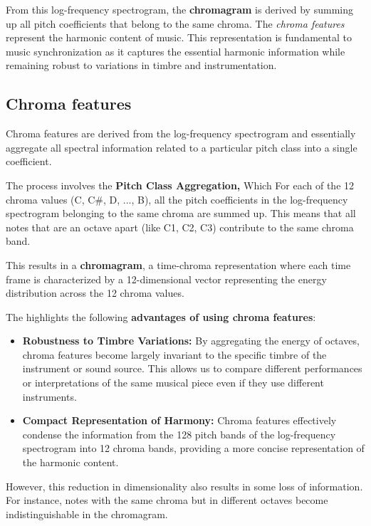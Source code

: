 \documentclass[a4paper, 9pt, twocolumn]{extarticle}
\begin{document}
    From this log-frequency spectrogram, the \textbf{chromagram} is derived
    by summing up all pitch coefficients that belong to the same chroma. The
    \emph{chroma features} represent the harmonic content of music. This
    representation is fundamental to music synchronization as it captures
    the essential harmonic information while remaining robust to variations
    in timbre and instrumentation.
    \subsection{Chroma features}
    Chroma features are derived from the log-frequency spectrogram
    and essentially aggregate all spectral information related to a
    particular pitch class into a single coefficient.
    
    The process involves the \textbf{Pitch Class Aggregation,} Which For
    each of the 12 chroma values (C, C\#, D, ..., B), all the pitch
    coefficients in the log-frequency spectrogram belonging to the same
    chroma are summed up. This means that all notes that are an octave apart
    (like C1, C2, C3) contribute to the same chroma band.
    
    This results in a \textbf{chromagram}, a time-chroma representation
    where each time frame is characterized by a 12-dimensional vector
    representing the energy distribution across the 12 chroma values.
    
    The highlights the following \textbf{advantages of using chroma
    features}:
    
    \begin{itemize}
    \item
      \textbf{Robustness to Timbre Variations:} By aggregating the energy of
      octaves, chroma features become largely invariant to the specific
      timbre of the instrument or sound source. This allows us to compare
      different performances or interpretations of the same musical piece
      even if they use different instruments.
    \item
      \textbf{Compact Representation of Harmony:} Chroma features
      effectively condense the information from the 128 pitch bands of the
      log-frequency spectrogram into 12 chroma bands, providing a more
      concise representation of the harmonic content.
    \end{itemize}
    
    However, this reduction in dimensionality also results in some loss of
    information. For instance, notes with the same chroma but in different
    octaves become indistinguishable in the chromagram.
    
\end{document}
